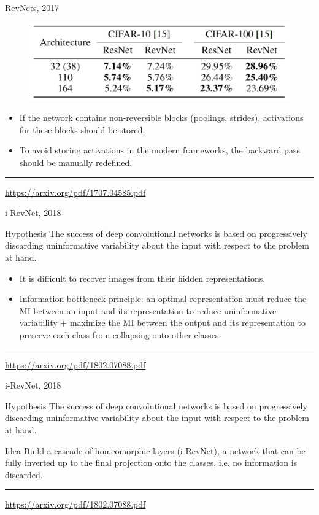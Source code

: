 \documentclass{beamer}
\begin{document}
\begin{frame}{RevNets, 2017}
	\begin{figure}
		\centering
		\includegraphics[width=0.8\linewidth]{figs/revnet_results.png}
	\end{figure}
	\begin{itemize}
		\item If the network contains non-reversible blocks (poolings, strides), activations for these blocks should be stored.
		\item To avoid storing activations in the modern frameworks, the backward pass should be manually redefined.
	\end{itemize}
	\vfill
	\hrule\medskip
	{\scriptsize \href{https://arxiv.org/pdf/1707.04585.pdf}{https://arxiv.org/pdf/1707.04585.pdf}} 
\end{frame}
\begin{frame}{i-RevNet, 2018}
	\begin{block}{Hypothesis}
		The success of deep convolutional networks is based on progressively discarding uninformative variability about the input with respect to the problem at hand. 
	\end{block}
	\begin{itemize}
		\item It is difficult to recover images from their hidden representations. 
		\item Information bottleneck principle: an optimal representation must reduce the MI between an input and its representation to reduce uninformative variability + maximize the MI between the output and its representation to preserve each class from collapsing onto other classes.
	\end{itemize}
	\vfill
	\hrule\medskip
	{\scriptsize \href{https://arxiv.org/pdf/1802.07088.pdf}{https://arxiv.org/pdf/1802.07088.pdf}} 
\end{frame}
\begin{frame}{i-RevNet, 2018}
	\begin{block}{Hypothesis}
		The success of deep convolutional networks is based on progressively discarding uninformative variability about the input with respect to the problem at hand. 
	\end{block}
	
	\begin{block}{Idea}
		Build a cascade of homeomorphic layers (i-RevNet), a network that can be fully inverted up to the final projection onto the classes, i.e. no information is discarded.
	\end{block}
	
	\vfill
	\hrule\medskip
	{\scriptsize \href{https://arxiv.org/pdf/1802.07088.pdf}{https://arxiv.org/pdf/1802.07088.pdf}} 
\end{frame}
\end{document}
